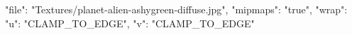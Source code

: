 {
  "file": "Textures/planet-alien-ashygreen-diffuse.jpg",
  "mipmaps": "true",
  "wrap": {
    "u": "CLAMP_TO_EDGE",
    "v": "CLAMP_TO_EDGE"
  }
}
